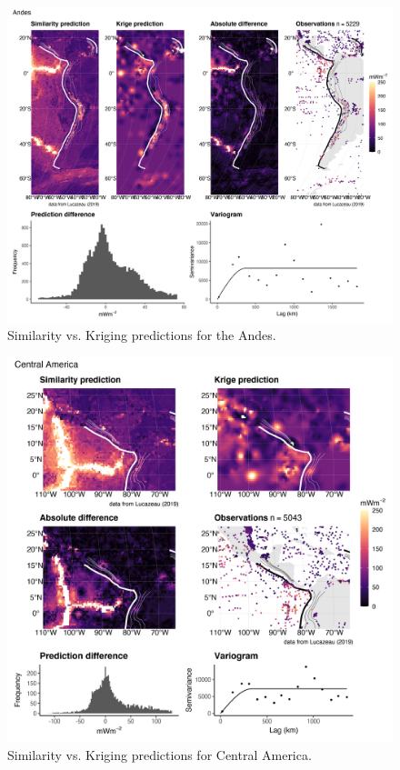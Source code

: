 \documentclass[draft,linenumbers]{agujournal2018}
\begin{document}
\begin{figure}[h]

{\centering \includegraphics[width=0.95\linewidth,]{../figs/diff/comp/Andes} 

}

\caption{Similarity vs. Kriging predictions for the Andes.}\label{fig:andes.comp}
\end{figure}

\begin{figure}[h]

{\centering \includegraphics[width=0.95\linewidth,]{../figs/diff/comp/Central_America} 

}

\caption{Similarity vs. Kriging predictions for Central America.}\label{fig:central.america.comp}
\end{figure}
\end{document}
